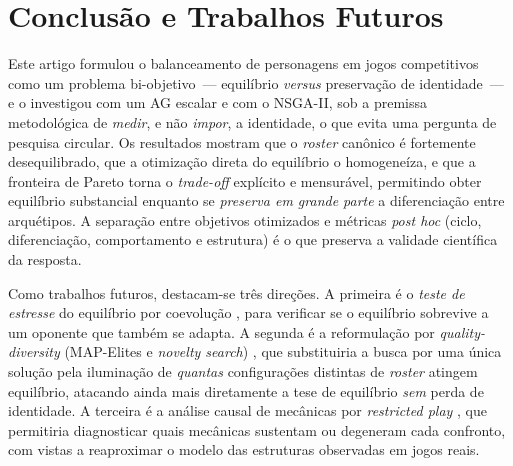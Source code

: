 \documentclass[12pt]{article}
\begin{document}
\section{Conclusão e Trabalhos Futuros}
\label{sec:conclusao}

Este artigo formulou o balanceamento de personagens em jogos competitivos como um
problema bi-objetivo~--- equilíbrio \emph{versus} preservação de identidade~--- e o
investigou com um AG escalar e com o NSGA-II, sob a premissa metodológica de
\emph{medir}, e não \emph{impor}, a identidade, o que evita uma pergunta de
pesquisa circular. Os resultados mostram que o \emph{roster} canônico é fortemente
desequilibrado, que a otimização direta do equilíbrio o homogeneíza, e que a
fronteira de Pareto torna o \emph{trade-off} explícito e mensurável, permitindo
obter equilíbrio substancial enquanto se \emph{preserva em grande parte} a
diferenciação entre arquétipos. A separação entre objetivos otimizados e métricas \emph{post hoc}
(ciclo, diferenciação, comportamento e estrutura) é o que preserva a validade
científica da resposta.

Como trabalhos futuros, destacam-se três direções. A primeira é o \emph{teste de
estresse} do equilíbrio por coevolução
\cite{chen2014mmorpg,livingstone2006coevolution}, para verificar se o equilíbrio
sobrevive a um oponente que também se adapta. A segunda é a reformulação por
\emph{quality-diversity} (MAP-Elites e \emph{novelty search})
\cite{mouret2015mapelites,lehman2011novelty}, que substituiria a busca por uma
única solução pela iluminação de \emph{quantas} configurações distintas de
\emph{roster} atingem equilíbrio, atacando ainda mais diretamente a tese de
equilíbrio \emph{sem} perda de identidade. A terceira é a análise causal de
mecânicas por \emph{restricted play} \cite{hom2007automatic}, que permitiria
diagnosticar quais mecânicas sustentam ou degeneram cada confronto, com vistas a
reaproximar o modelo das estruturas observadas em jogos reais.



\end{document}
